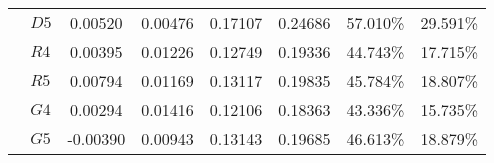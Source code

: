 \begin{table}[ht]
{\begin{threeparttable}
\begin{tabular}{lcccccc}
$~~~~D5$          &0.00520  &0.00476 &0.17107 &0.24686 &57.010\% &29.591\%\\
$~~~~R4$          &0.00395  &0.01226 &0.12749 &0.19336 &44.743\% &17.715\%\\
$~~~~R5$          &0.00794  &0.01169 &0.13117 &0.19835 &45.784\% &18.807\%\\
$~~~~G4$          &0.00294  &0.01416 &0.12106 &0.18363 &43.336\% &15.735\%\\
$~~~~G5$          &-0.00390 &0.00943 &0.13143 &0.19685 &46.613\% &18.879\%\\
\bottomrule\bottomrule
\end{tabular}
\end{threeparttable}}
\end{table}